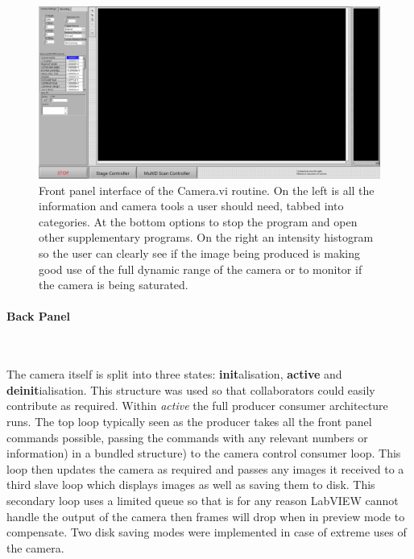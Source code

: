 \begin{figure}
\centering
\includegraphics[width=\linewidth]{Figures/camera_frontpanel}
\caption[Front Panel of Camera.vi]{Front panel interface of the Camera.vi routine.
On the left is all the information and camera tools a user should need, tabbed into categories.
At the bottom options to stop the program and open other supplementary programs.
On the right an intensity histogram so the user can clearly see if the image being produced is making good use of the full dynamic range of the camera or to monitor if the camera is being saturated.}
\label{fig:camera_frontpanel}
\end{figure}

\paragraph{Back Panel}~

The camera itself is split into three states: \textbf{init}alisation, \textbf{active} and \textbf{deinit}ialisation.
This structure was used so that collaborators could easily contribute as required.
Within \textit{active} the full producer consumer architecture runs.
The top loop typically seen as the producer takes all the front panel commands possible, passing the commands with any relevant numbers or information) in a bundled structure) to the camera control consumer loop.
This loop then updates the camera as required and passes any images it received to a third slave loop which displays images as well as saving them to disk.
This secondary loop uses a limited queue so that is for any reason LabVIEW cannot handle the output of the camera then frames will drop when in preview mode to compensate.
Two disk saving modes were implemented in case of extreme uses of the camera.

